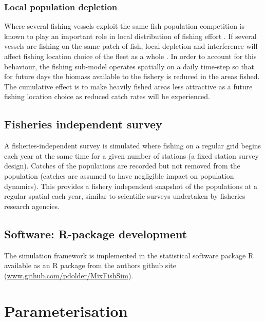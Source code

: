 \documentclass[review]{elsarticle}
\begin{document}
\subsubsection{Local population depletion}

Where several fishing vessels exploit the same fish population competition is
known to play an important role in local distribution of fishing effort
\citep{Gillis1998}. If several vessels are fishing on the same patch of fish,
local depletion and interference  will affect fishing
location choice of the fleet as a whole \citep{Rijnsdorp2000, Poos2007a}. In
order to account for this behaviour, the fishing sub-model operates spatially
on a daily time-step so that for future days the biomass available to the
fishery is reduced in the areas fished. The cumulative effect is to make
heavily fished areas less attractive as a future fishing location choice as
reduced catch rates will be experienced. 

\subsection{Fisheries independent survey}

A fisheries-independent survey is simulated where fishing on a regular grid
begins each year at the same time for a given number of stations (a fixed
station survey design). Catches of the populations  are recorded but not removed from the population
(catches are assumed to have negligible impact on population dynamics). This
provides a fishery independent snapshot of the populations at a regular spatial
 each year, similar to scientific
surveys undertaken by fisheries research agencies. \\

\subsection{Software: R-package development}

The simulation framework is implemented in the statistical software package R
\citep{RCoreTeam2017}  available as an R package from
the authors github site (\url{www.github.com/pdolder/MixFishSim}).\\

\section{Parameterisation}
\end{document}
